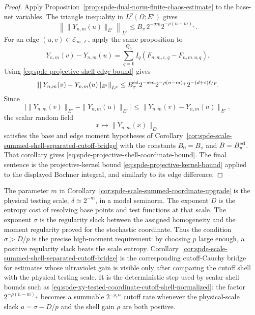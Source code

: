 \begin{proof}
Apply Proposition~\ref{prop:spde-dual-norm-finite-chaos-estimate} to the
base-net variables.  The triangle inequality in \(L^p(\Omega;E')\) gives
\[
  \left\|\|Y_{n,m}(u)\|_{E'}\right\|_{L^p}
  \leq
  B_\pi\,2^{-\sigma m}2^{-\rho(n-m)_+}.
\]
For an edge \((u,v)\in\mathcal E_{m,\ell}\), apply the same proposition to
\[
  Y_{n,m}(v)-Y_{n,m}(u)
  =
  \sum_{q=0}^{Q_0}
  I_q(F_{n,m,v,q}-F_{n,m,u,q}).
\]
Using \eqref{eq:spde-projective-shell-edge-bound} gives
\[
  \left\|
    \|Y_{n,m}(v)-Y_{n,m}(u)\|_{E'}
  \right\|_{L^p}
  \leq
  B_\pi^{\rm ed}
  2^{-\sigma m}2^{-\rho(n-m)_+}
  2^{-(d+\varepsilon)\ell/p}.
\]
Since
\[
  \bigl|\|Y_{n,m}(v)\|_{E'}-\|Y_{n,m}(u)\|_{E'}\bigr|
  \leq
  \|Y_{n,m}(v)-Y_{n,m}(u)\|_{E'},
\]
the scalar random field
\[
  x\longmapsto \|Y_{n,m}(x)\|_{E'}
\]
satisfies the base and edge moment hypotheses of
Corollary~\ref{cor:spde-scale-summed-shell-separated-cutoff-bridge} with
the constants \(B_0=B_\pi\) and \(B=B_\pi^{\rm ed}\).  That corollary gives
\eqref{eq:spde-projective-shell-coordinate-bound}.  The final sentence is
the projective-kernel bound
\eqref{eq:spde-projective-kernel-bound} applied to the displayed Bochner
integral, and similarly to its edge difference.
\end{proof}

The parameter \(m\) in
Corollary~\ref{cor:spde-scale-summed-coordinate-upgrade} is the physical
testing scale, \(\delta\simeq2^{-m}\), in a model seminorm.  The exponent
\(D\) is the entropy cost of resolving base points and test functions at
that scale.  The exponent \(\sigma\) is the regularity slack between the
assigned homogeneity and the moment regularity proved for the stochastic
coordinate.  Thus the condition \(\sigma>D/p\) is the precise high-moment
requirement: by choosing \(p\) large enough, a positive regularity slack
beats the scale entropy.
Corollary~\ref{cor:spde-scale-summed-shell-separated-cutoff-bridge} is the
corresponding cutoff-Cauchy bridge for estimates whose ultraviolet gain is
visible only after comparing the cutoff shell with the physical testing scale.
It is the deterministic step used by scalar shell bounds such as
\eqref{eq:spde-xy-tested-coordinate-cutoff-shell-normalized}: the factor
\(2^{-\rho(n-m)_+}\) becomes a summable \(2^{-\rho_*n}\) cutoff rate whenever
the physical-scale slack \(a=\sigma-D/p\) and the shell gain \(\rho\) are both
positive.

